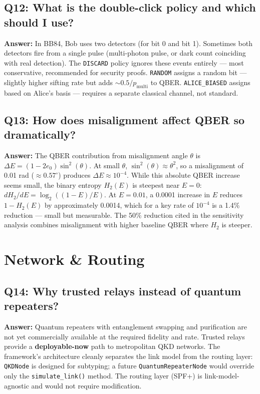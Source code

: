 \documentclass[11pt,a4paper,oneside]{report}
\begin{document}
\subsection*{Q12: What is the double-click policy and which should I use?}
\textbf{Answer:} In BB84, Bob uses two detectors (for bit 0 and bit 1). Sometimes both detectors fire from a single pulse (multi-photon pulse, or dark count coinciding with real detection). The \texttt{DISCARD} policy ignores these events entirely — most conservative, recommended for security proofs. \texttt{RANDOM} assigns a random bit — slightly higher sifting rate but adds $\sim 0.5/p_{\text{multi}}$ to QBER. \texttt{ALICE\_BIASED} assigns based on Alice's basis — requires a separate classical channel, not standard.

\subsection*{Q13: How does misalignment affect QBER so dramatically?}
\textbf{Answer:} The QBER contribution from misalignment angle $\theta$ is $\Delta E = (1-2e_0)\sin^2(\theta)$. At small $\theta$, $\sin^2(\theta) \approx \theta^2$, so a misalignment of 0.01 rad ($\approx 0.57^\circ$) produces $\Delta E \approx 10^{-4}$. While this absolute QBER increase seems small, the binary entropy $H_2(E)$ is steepest near $E = 0$: $dH_2/dE = \log_2((1-E)/E)$. At $E = 0.01$, a 0.0001 increase in $E$ reduces $1 - H_2(E)$ by approximately 0.0014, which for a key rate of $10^{-4}$ is a 1.4\% reduction — small but measurable. The 50\% reduction cited in the sensitivity analysis combines misalignment with higher baseline QBER where $H_2$ is steeper.

\section{Network \& Routing}

\subsection*{Q14: Why trusted relays instead of quantum repeaters?}
\textbf{Answer:} Quantum repeaters with entanglement swapping and purification are not yet commercially available at the required fidelity and rate. Trusted relays provide a \textbf{deployable-now} path to metropolitan QKD networks. The framework's architecture cleanly separates the link model from the routing layer: \texttt{QKDNode} is designed for subtyping; a future \texttt{QuantumRepeaterNode} would override only the \texttt{simulate\_link()} method. The routing layer (SPF+) is link-model-agnostic and would not require modification.
\end{document}
